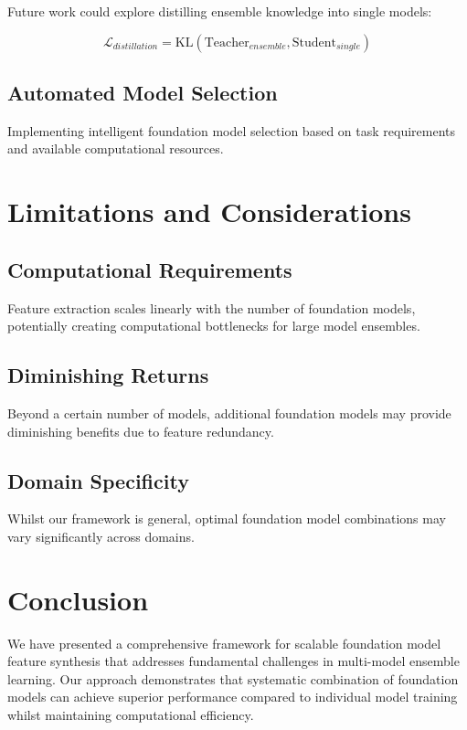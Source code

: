 \documentclass[11pt,a4paper]{article}
\begin{document}
Future work could explore distilling ensemble knowledge into single models:

\begin{equation}
\mathcal{L}_{distillation} = \text{KL}(\text{Teacher}_{ensemble}, \text{Student}_{single})
\end{equation}

\subsection{Automated Model Selection}

Implementing intelligent foundation model selection based on task requirements and available computational resources.

\section{Limitations and Considerations}

\subsection{Computational Requirements}

Feature extraction scales linearly with the number of foundation models, potentially creating computational bottlenecks for large model ensembles.

\subsection{Diminishing Returns}

Beyond a certain number of models, additional foundation models may provide diminishing benefits due to feature redundancy.

\subsection{Domain Specificity}

Whilst our framework is general, optimal foundation model combinations may vary significantly across domains.

\section{Conclusion}

We have presented a comprehensive framework for scalable foundation model feature synthesis that addresses fundamental challenges in multi-model ensemble learning. Our approach demonstrates that systematic combination of foundation models can achieve superior performance compared to individual model training whilst maintaining computational efficiency.
\end{document}

